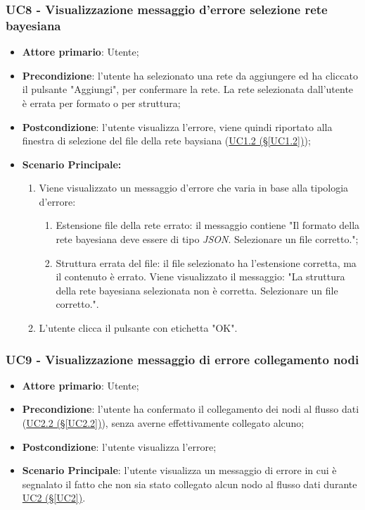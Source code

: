 \subsubsection{UC8 - Visualizzazione messaggio d'errore selezione  rete bayesiana}\label{UC8}
\begin{itemize}
\item \textbf{Attore primario}: Utente;
\item \textbf{Precondizione}: l'utente ha selezionato una rete da aggiungere ed ha cliccato il pulsante "Aggiungi", per confermare la rete. La rete selezionata dall'utente è errata per formato o per struttura;
\item \textbf{Postcondizione}: l'utente visualizza l'errore, viene quindi riportato alla finestra di selezione del file della rete baysiana (\hyperref[UC1.2]{UC1.2 (§\ref*{UC1.2})});
\item \textbf{Scenario Principale:} 
	\begin{enumerate}
		\item Viene visualizzato un messaggio d'errore che varia in base alla tipologia d'errore:
			\begin{enumerate}
				\item Estensione file della rete errato: il messaggio contiene "Il formato della rete bayesiana deve essere di tipo \textit{JSON}. Selezionare un file corretto.";
				\item Struttura errata del file: il file selezionato ha l'estensione corretta, ma il contenuto è errato. Viene visualizzato il messaggio: "La struttura della rete bayesiana selezionata non è corretta. Selezionare un file corretto.".
			\end{enumerate}
		\item L'utente clicca il pulsante con etichetta "OK".
	\end{enumerate}
\end{itemize}

\pagebreak

\subsubsection{UC9 - Visualizzazione messaggio di errore collegamento nodi}\label{UC9}
\begin{itemize}
\item \textbf{Attore primario}: Utente;
\item \textbf{Precondizione}: l'utente ha confermato il collegamento dei nodi al flusso dati (\hyperref[UC2.2]{UC2.2 (§\ref*{UC2.2})}), senza averne effettivamente collegato alcuno;
\item \textbf{Postcondizione}: l'utente visualizza l'errore;
\item \textbf{Scenario Principale}: l'utente visualizza un messaggio di errore in cui è segnalato il fatto che non sia stato collegato alcun nodo al flusso dati durante \hyperref[UC2]{UC2 (§\ref*{UC2})}.
\end{itemize}

